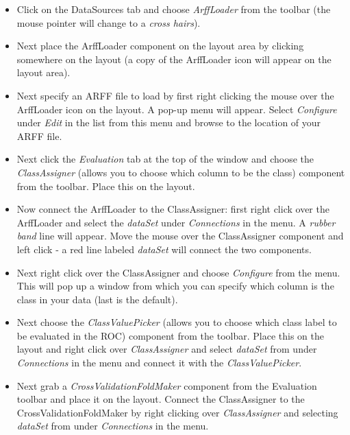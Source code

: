 \documentclass[a4paper]{article}
\begin{document}
\begin{itemize}
	\item Click on the DataSources tab and choose \textit{ArffLoader} from the
	toolbar (the mouse pointer will change to a \textit{cross hairs}).

	\item Next place the ArffLoader component on the layout area by clicking
	somewhere on the layout (a copy of the ArffLoader icon will appear on
	the layout area).

	\item Next specify an ARFF file to load by first right clicking the mouse
	over the ArffLoader icon on the layout. A pop-up menu will
	appear. Select \textit{Configure} under \textit{Edit} in the list from this menu and
	browse to the location of your ARFF file.

	\item Next click the \textit{Evaluation} tab at the top of the window and choose the
	\textit{ClassAssigner} (allows you to choose which column to be the class)
	component from the toolbar. Place this on the layout.

	\item Now connect the ArffLoader to the ClassAssigner: first right click
	over the ArffLoader and select the \textit{dataSet} under \textit{Connections} in
	the menu. A \textit{rubber band} line will appear. Move the mouse over the
	ClassAssigner component and left click - a red line labeled \textit{dataSet}
	will connect the two components.

	\item Next right click over the ClassAssigner and choose \textit{Configure} from
	the menu. This will pop up a window from which you can specify which
	column is the class in your data (last is the default).

	\item Next choose the \textit{ClassValuePicker} (allows you to choose which class 
	label to be evaluated in the ROC) component from the toolbar. Place this on the layout
	and right click over \textit{ClassAssigner} and select \textit{dataSet} from under
	\textit{Connections} in the menu and connect it with the \textit{ClassValuePicker}.

	\item Next grab a \textit{CrossValidationFoldMaker} component from the Evaluation
	toolbar and place it on the layout. Connect the ClassAssigner to the
	CrossValidationFoldMaker by right clicking over \textit{ClassAssigner} and
	selecting \textit{dataSet} from under \textit{Connections} in the menu.


\end{itemize}
\end{document}

